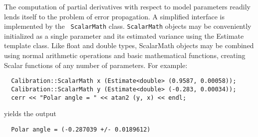 \documentclass[12pt]{article}
\begin{document}
The computation of partial derivatives with respect to model
parameters readily lends itself to the problem of error propagation.
A simplified interface is implemented by the {\tt
ScalarMath} class.  {\tt ScalarMath} objects may be
conveniently initialized as a single parameter and its estimated
variance using the Estimate template class.  Like float and double
types, ScalarMath objects may be combined using normal arithmetic
operations and basic mathematical functions, creating Scalar functions
of any number of parameters.  For example:
\begin{verbatim}
  Calibration::ScalarMath x (Estimate<double> (0.9587, 0.00058));
  Calibration::ScalarMath y (Estimate<double> (-0.283, 0.00034));
  cerr << "Polar angle = " << atan2 (y, x) << endl;
\end{verbatim}
yields the output
\begin{verbatim}
  Polar angle = (-0.287039 +/- 0.0189612)
\end{verbatim}
\end{document}
